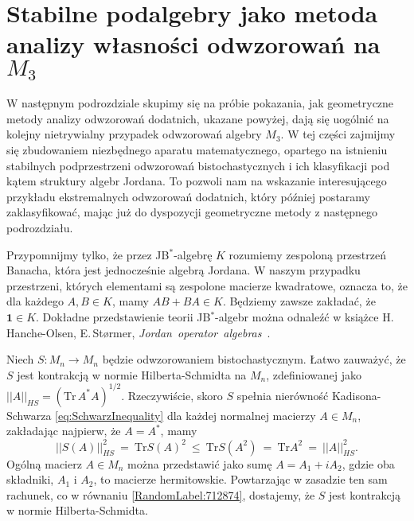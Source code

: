 {\section{Stabilne podalgebry jako metoda analizy własności odwzorowań na $M_{3}$}
\label{sec:M3notes}

W następnym podrozdziale skupimy się na próbie pokazania,
jak geometryczne metody analizy odwzorowań dodatnich,
ukazane powyżej,
dają się uogólnić na kolejny nietrywialny przypadek odwzorowań algebry $M_{3}$.
W tej części zajmijmy się zbudowaniem niezbędnego aparatu matematycznego,
opartego na istnieniu stabilnych podprzestrzeni odwzorowań bistochastycznych
i ich klasyfikacji pod kątem struktury algebr Jordana.
To pozwoli nam na wskazanie interesującego przykładu ekstremalnych odwzorowań
dodatnich, który później postaramy zaklasyfikować, mając już do dyspozycji
geometryczne metody z następnego podrozdziału.

Przypomnijmy tylko, że przez JB$^{*}$-algebrę $K$ rozumiemy zespoloną
przestrzeń Banacha, która jest jednocześnie algebrą Jordana.
W naszym przypadku przestrzeni, których elementami są zespolone macierze
kwadratowe,
oznacza to, że dla każdego $A, B \in K$, mamy
$AB + BA \in K$.
Będziemy zawsze zakładać, że $\mathbf{1} \in K$.
Dokładne przedstawienie teorii JB$^{*}$-algebr można odnaleźć w książce
H.\,Hanche-Olsen, E.\,St{\o}rmer,
\mbox{\emph{Jordan operator algebras} \cite{Hanche1984}}.

\vspace{0.5cm}
Niech $S\!: M_{n} \rightarrow M_{n}$ będzie odwzorowaniem bistochastycznym.
Łatwo zauważyć, że $S$ jest kontrakcją w normie Hilberta-Schmidta
na $M_{n}$, zdefiniowanej jako
$||A||_{HS} = \left( \text{Tr} \, A^{*} A \right)^{1/2}$.
Rzeczywiście, skoro $S$ spełnia nierówność Kadisona-Schwarza
\eqref{eq:SchwarzInequality}
dla każdej normalnej macierzy $A \in M_{n}$,
zakładając najpierw, że $A = A^{*}$,
mamy
\begin{equation}
\label{RandomLabel:712874}
    || S(A) ||_{HS}^{2} \: = \: \text{Tr} S(A)^{2}
    \: \leq \:  \text{Tr} S(A^{2}) \: = \:
        \text{Tr} A^{2} \: = \: ||A||_{HS}^{2}.
\end{equation}
Ogólną macierz $A \in M_{n}$ można przedstawić jako sumę
$A = A_{1} + i A_{2}$,
gdzie oba składniki, $A_{1}$ i $A_{2}$, to macierze hermitowskie.
Powtarzając w zasadzie ten sam rachunek, co w równaniu
\eqref{RandomLabel:712874},
dostajemy, że $S$ jest kontrakcją w normie Hilberta-Schmidta.

}
